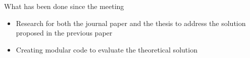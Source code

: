 \section{}
    \begin{frame}[allowframebreaks]{What has been done since the meeting}
        \begin{itemize}
            \item Research for both the journal paper and the thesis to address the solution proposed in the previous paper
            \item Creating modular code to evaluate the theoretical solution
        \end{itemize}
    \end{frame}

    \subsection{}
        
        

